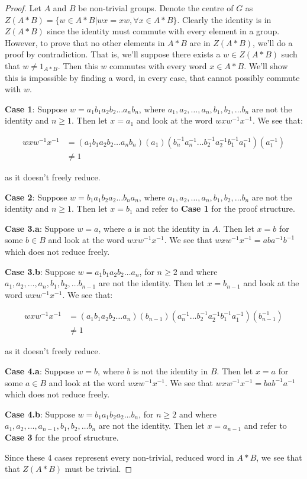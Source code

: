 \documentclass[12pt]{article}%
\begin{document}
\begin{proof}
Let $A$ and $B$ be non-trivial groups. Denote the centre of $G$ as
$Z(A*B)=\{ w \in A*B | wx=xw, \forall x \in A*B \}$. Clearly the identity is in $Z(A*B)$ since the
identity must commute with every element in a group. However, to prove that no other elements in $A*B$ are
in $Z(A*B)$, we'll do a proof by contradiction. That is, we'll suppose there exists a $w\in Z(A*B)$ such
that $w \neq 1_{A*B}$. Then this $w$ commutes with every word $x \in A*B$. We'll show this is impossible
by finding a word, in every case, that cannot possibly commute with $w$.

\textbf{Case 1}: Suppose $w=a_{1}b_{1}a_{2}b_{2}\ldots a_{n}b_{n}$, where
$a_1,a_2,\ldots ,a_n, b_1,b_2,\ldots b_n$ are not the identity and $n\geq 1$. Then let $x=a_1$ and look
at the word $wxw^{-1}x^{-1}$. We see that:

\begin{align*}
  wxw^{-1}x^{-1} &= (a_{1}b_{1}a_{2}b_{2}\ldots a_{n}b_{n}) (a_{1}) (b_{n}^{-1}a_{n}^{-1}\ldots b_{2}^{-1}a_{2}^{-1}b_{1}^{-1}a_{1}^{-1}) (a_{1}^{-1}) \\
  &\neq 1
\end{align*}

as it doesn't freely reduce.

\textbf{Case 2}: Suppose $w=b_{1}a_{1}b_{2}a_{2}\ldots b_{n}a_{n}$, where
$a_1,a_2,\ldots ,a_n, b_1,b_2,\ldots b_n$ are not the identity and $n\geq 1$. Then let $x=b_1$ and refer
to \textbf{Case 1} for the proof structure.

\textbf{Case 3.a}:
Suppose $w=a$, where $a$ is not the identity in $A$. Then let $x=b$ for some $b\in B$ and look at the word
$wxw^{-1}x^{-1}$. We see that $wxw^{-1}x^{-1}=aba^{-1}b^{-1}$ which does not reduce freely.

\textbf{Case 3.b}:
Suppose $w=a_{1}b_{1}a_{2}b_{2}\ldots a_{n}$, for $n\geq 2$ and where $a_1,a_2,\ldots ,a_n, b_1,b_2,\ldots b_{n-1}$ are not the identity. Then let $x=b_{n-1}$ and look at the word $wxw^{-1}x^{-1}$. We see that:

\begin{align*}
  wxw^{-1}x^{-1} &= (a_{1}b_{1}a_{2}b_{2}\ldots a_{n}) (b_{n-1}) (a_{n}^{-1}\ldots b_{2}^{-1}a_{2}^{-1}b_{1}^{-1}a_{1}^{-1}) (b_{n-1}^{-1}) \\
  &\neq 1
\end{align*}

as it doesn't freely reduce.

\textbf{Case 4.a}:
Suppose $w=b$, where $b$ is not the identity in $B$. Then let $x=a$ for some $a\in B$ and look at the word
$wxw^{-1}x^{-1}$. We see that $wxw^{-1}x^{-1}=bab^{-1}a^{-1}$ which does not reduce freely.

\textbf{Case 4.b}: Suppose $w=b_{1}a_{1}b_{2}a_{2}\ldots b_{n}$, for $n\geq 2$ and where
$a_1,a_2,\ldots ,a_{n-1}, b_1,b_2,\ldots b_n$ are not the identity. Then let $x=a_{n-1}$ and refer to
\textbf{Case 3} for the proof structure.

Since these 4 cases represent every non-trivial, reduced word in $A*B$, we see that that $Z(A*B)$ must
be trivial.
\end{proof}
\end{document}
